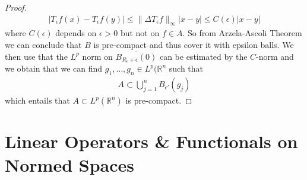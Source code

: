 \documentclass[11pt,a4paper]{article}
\theoremstyle{definition}
\begin{document}
\begin{proof}
\begin{align*}
|T_\epsilon f(x) - T_\epsilon f(y)| \leq \| \Delta T_\epsilon f \|_\infty |x-y| \leq C(\epsilon)|x-y|
\end{align*}
where $C(\epsilon)$ depends on $\epsilon >0$ but not on $f \in A$. So from Arzela-Ascoli Theorem we can conclude that $B$ is pre-compact and thus cover it with epsilon balls. We then use that the $L^p$ norm on $ \overline{B_{R_\epsilon +\epsilon}(0)}$ can be estimated by the $C$-norm and we obtain that we can find $g_1, \dots , g_n \in L^p ( \mathbb{R}^n$ such that
\begin{align*}
A \subset \bigcup_{j=1}^n B_{\epsilon'} (g_j)
\end{align*}
which entails that $A\subset L^p(\mathbb{R}^n)$ is pre-compact. 
\end{proof}
\newpage
\section{Linear Operators \& Functionals on Normed Spaces}
\end{document}
